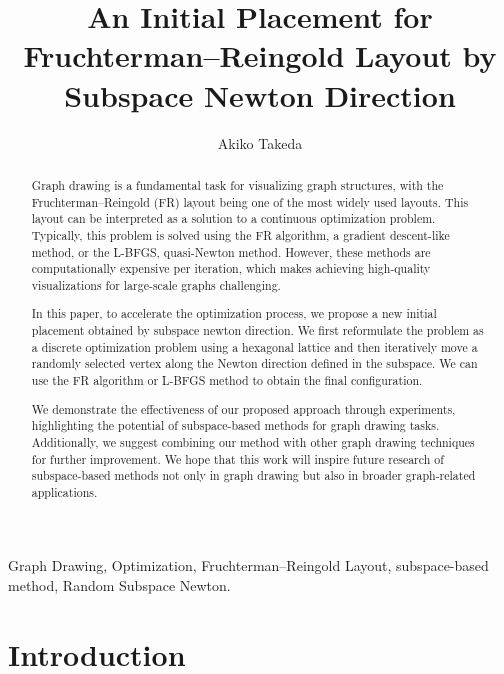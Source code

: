 \documentclass[dvipdfmx,journal]{IEEEtran}
\begin{document}

\title{
  An Initial Placement
  for Fruchterman--Reingold Layout
  by Subspace Newton Direction
}
\author{
  Akiko Takeda
}
\maketitle

\begin{abstract}
  Graph drawing is a fundamental task for visualizing graph structures, with the Fruchterman--Reingold (FR) layout being one of the most widely used layouts.
  This layout can be interpreted as a solution to a continuous optimization problem.
  Typically, this problem is solved using the FR algorithm, a gradient descent-like method, or the L-BFGS, quasi-Newton method.
  However, these methods are computationally expensive per iteration, which makes achieving high-quality visualizations for large-scale graphs challenging.

  In this paper, to accelerate the optimization process, we propose a new initial placement obtained by subspace newton direction.
  We first reformulate the problem as a discrete optimization problem using a hexagonal lattice
  and then iteratively move a randomly selected vertex along the Newton direction defined in the subspace.
  We can use the FR algorithm or L-BFGS method to obtain the final configuration.

  We demonstrate the effectiveness of our proposed approach through experiments, highlighting the potential of subspace-based methods for graph drawing tasks.
  Additionally, we suggest combining our method with other graph drawing techniques for further improvement.
  We hope that this work will inspire future research of subspace-based methods not only in graph drawing but also in broader graph-related applications.
\end{abstract}

\begin{IEEEkeywords}
  Graph Drawing, Optimization, Fruchterman--Reingold Layout, subspace-based method, Random Subspace Newton.
\end{IEEEkeywords}

\section{Introduction}\label{sec:introduction}
\end{document}
